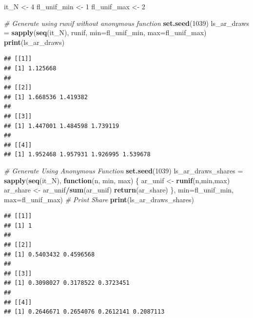 \documentclass[
]{book}
\newenvironment{Shaded}{\begin{snugshade}}{\end{snugshade}}
\newcommand{\CommentTok}[1]{\textcolor[rgb]{0.56,0.35,0.01}{\textit{#1}}}
\newcommand{\ControlFlowTok}[1]{\textcolor[rgb]{0.13,0.29,0.53}{\textbf{#1}}}
\newcommand{\DataTypeTok}[1]{\textcolor[rgb]{0.13,0.29,0.53}{#1}}
\newcommand{\DecValTok}[1]{\textcolor[rgb]{0.00,0.00,0.81}{#1}}
\newcommand{\KeywordTok}[1]{\textcolor[rgb]{0.13,0.29,0.53}{\textbf{#1}}}
\newcommand{\NormalTok}[1]{#1}
\newcommand{\OperatorTok}[1]{\textcolor[rgb]{0.81,0.36,0.00}{\textbf{#1}}}
\newcommand{\StringTok}[1]{\textcolor[rgb]{0.31,0.60,0.02}{#1}}
\begin{document}
\begin{Shaded}
\begin{Highlighting}[]
\NormalTok{it\_N \textless{}{-}}\StringTok{ }\DecValTok{4}
\NormalTok{fl\_unif\_min \textless{}{-}}\StringTok{ }\DecValTok{1}
\NormalTok{fl\_unif\_max \textless{}{-}}\StringTok{ }\DecValTok{2}

\CommentTok{\# Generate using runif without anonymous function}
\KeywordTok{set.seed}\NormalTok{(}\DecValTok{1039}\NormalTok{)}
\NormalTok{ls\_ar\_draws =}\StringTok{ }\KeywordTok{sapply}\NormalTok{(}\KeywordTok{seq}\NormalTok{(it\_N),}
\NormalTok{                     runif,}
                     \DataTypeTok{min=}\NormalTok{fl\_unif\_min, }\DataTypeTok{max=}\NormalTok{fl\_unif\_max)}
\KeywordTok{print}\NormalTok{(ls\_ar\_draws)}
\end{Highlighting}
\end{Shaded}

\begin{verbatim}
## [[1]]
## [1] 1.125668
## 
## [[2]]
## [1] 1.668536 1.419382
## 
## [[3]]
## [1] 1.447001 1.484598 1.739119
## 
## [[4]]
## [1] 1.952468 1.957931 1.926995 1.539678
\end{verbatim}

\begin{Shaded}
\begin{Highlighting}[]
\CommentTok{\# Generate Using Anonymous Function}
\KeywordTok{set.seed}\NormalTok{(}\DecValTok{1039}\NormalTok{)}
\NormalTok{ls\_ar\_draws\_shares =}\StringTok{ }\KeywordTok{sapply}\NormalTok{(}\KeywordTok{seq}\NormalTok{(it\_N),}
                            \ControlFlowTok{function}\NormalTok{(n, min, max) \{}
\NormalTok{                              ar\_unif \textless{}{-}}\StringTok{ }\KeywordTok{runif}\NormalTok{(n,min,max)}
\NormalTok{                              ar\_share \textless{}{-}}\StringTok{ }\NormalTok{ar\_unif}\OperatorTok{/}\KeywordTok{sum}\NormalTok{(ar\_unif)}
                              \KeywordTok{return}\NormalTok{(ar\_share)}
\NormalTok{                            \},}
                            \DataTypeTok{min=}\NormalTok{fl\_unif\_min, }\DataTypeTok{max=}\NormalTok{fl\_unif\_max)}
\CommentTok{\# Print Share}
\KeywordTok{print}\NormalTok{(ls\_ar\_draws\_shares)}
\end{Highlighting}
\end{Shaded}

\begin{verbatim}
## [[1]]
## [1] 1
## 
## [[2]]
## [1] 0.5403432 0.4596568
## 
## [[3]]
## [1] 0.3098027 0.3178522 0.3723451
## 
## [[4]]
## [1] 0.2646671 0.2654076 0.2612141 0.2087113
\end{verbatim}
\end{document}
